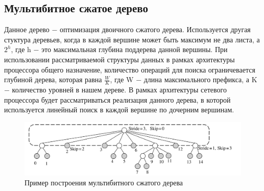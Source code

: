 \documentclass[a4peper, 12pt, titlepage, finall]{report}
\begin{document}
        \subsection{Мультибитное сжатое дерево}
            Данное дерево $-$ оптимизация двоичного сжатого дерева. Используется другая стуктура деревьев, когда в каждой вершине
            может быть максимум не два листа, а {\ttfamily $2^h$}, где {\ttfamily h} $-$ это максимальная глубина поддерева данной вершины.
            При использовании рассматриваемой структуры данных в рамках архитектуры процессора общего назначение, количество операций для поиска ограничевается глубиной дерева,
            которая равна {\ttfamily $\frac{W}{K}$}, где {\ttfamily W} $-$ длина максимального префикса, а {\ttfamily K} $-$ количество уровней в нашем дереве.
            В рамках архитектуры сетевого процессора будет рассматриваться реализация данного дерева, в которой используется линейный поиск в каждой вершине по дочерним вершинам.

            \begin{figure}[h]
                \includegraphics[width=\textwidth]{level_compressed_trie.png}
                \caption{Пример построения мультибитного сжатого дерева}\label{fig:mesh3}
            \end{figure}
\end{document}
